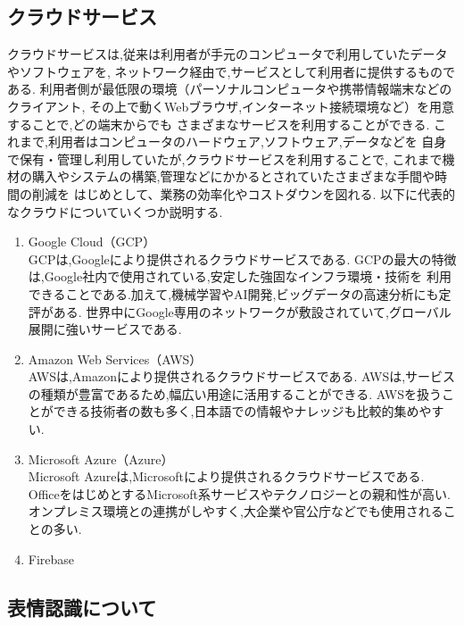 \subsection{クラウドサービス}
クラウドサービスは,従来は利用者が手元のコンピュータで利用していたデータやソフトウェアを,
ネットワーク経由で,サービスとして利用者に提供するものである.
利用者側が最低限の環境（パーソナルコンピュータや携帯情報端末などのクライアント,
その上で動くWebブラウザ,インターネット接続環境など）を用意することで,どの端末からでも
さまざまなサービスを利用することができる.
これまで,利用者はコンピュータのハードウェア,ソフトウェア,データなどを
自身で保有・管理し利用していたが,クラウドサービスを利用することで,
これまで機材の購入やシステムの構築,管理などにかかるとされていたさまざまな手間や時間の削減を
はじめとして、業務の効率化やコストダウンを図れる.
以下に代表的なクラウドについていくつか説明する.

\renewcommand{\labelenumi}{(\arabic{enumi})}

\begin{enumerate}
  \item Google Cloud（GCP） \\
  GCPは,Googleにより提供されるクラウドサービスである.
  GCPの最大の特徴は,Google社内で使用されている,安定した強固なインフラ環境・技術を
  利用できることである.加えて,機械学習やAI開発,ビッグデータの高速分析にも定評がある.
  世界中にGoogle専用のネットワークが敷設されていて,グローバル展開に強いサービスである.  \\

  \item Amazon Web Services（AWS） \\
  AWSは,Amazonにより提供されるクラウドサービスである.
  AWSは,サービスの種類が豊富であるため,幅広い用途に活用することができる.
  AWSを扱うことができる技術者の数も多く,日本語での情報やナレッジも比較的集めやすい.\\

  \item Microsoft Azure（Azure） \\
  Microsoft Azureは,Microsoftにより提供されるクラウドサービスである. 
  OfficeをはじめとするMicrosoft系サービスやテクノロジーとの親和性が高い.
  オンプレミス環境との連携がしやすく,大企業や官公庁などでも使用されることの多い.\\

  \item  Firebase \\
\end{enumerate}

\subsection{表情認識について}

